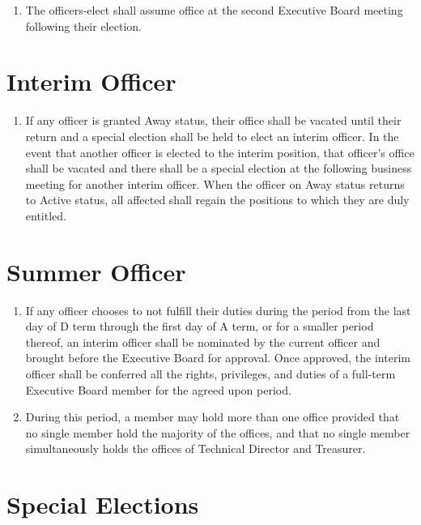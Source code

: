 \documentclass[12pt,letterpaper,oneside]{book}
\begin{document}
\begin{enumerate}
\item The officers-elect shall assume office at the second Executive Board meeting following their election.

\end{enumerate}

\section{Interim Officer}

\begin{enumerate}

\item If any officer is granted Away status, their office shall be vacated until their return and a special election shall be held to elect an interim officer. In the event that another officer is elected to the interim position, that officer’s office shall be vacated and there shall be a special election at the following business meeting for another interim officer. When the officer on Away status returns to Active status, all affected shall regain the positions to which they are duly entitled.

\end{enumerate}

\section{Summer Officer} \label{sec:summerofficer}

\begin{enumerate}

\item If any officer chooses to not fulfill their duties during the period from the last day of D term through the first day of A term, or for a smaller period thereof, an interim officer shall be nominated by the current officer and brought before the Executive Board for approval. Once approved, the interim officer shall be conferred all the rights, privileges, and duties of a full-term Executive Board member for the agreed upon period.
\item During this period, a member may hold more than one office provided that no single member hold the majority of the offices, and that no single member simultaneously holds the offices of Technical Director and Treasurer.

\end{enumerate}

\section{Special Elections} \label{sec:specialelections}
\end{document}
